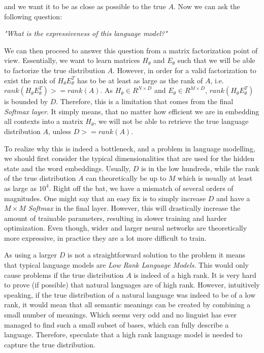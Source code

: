 and we want it to be as close as possible to the true $ A $. Now we can ask the following question:

\begin{center}
    \emph{"What is the expressiveness of this language model?"}
\end{center}

We can then proceed to answer this question from a matrix factorization point of view. Essentially, we want to learn matrices $ H_\theta $ and $ E_\theta $ such that we will be able to factorize the true distribution $ A $. However, in order for a valid factorization to exist the rank of $ H_\theta E^T_\theta $ has to be at least as large as the rank of $ A $, i.e. $ rank(H_\theta E^T_\theta ) >= rank(A) $. As $ H_\theta \in R^{N \times D} $ and $ E_\theta \in R^{M \times D} $, $ rank(H_\theta E^T_\theta ) $ is bounded by $ D $. Therefore, this is a limitation that comes from the final \emph{Softmax layer}. It simply means, that no matter how efficient we are in embedding all contexts into a matrix $ H_\theta $, we will not be able to retrieve the true language distribution $ A $, unless $ D >= rank(A) $.

To realize why this is indeed a bottleneck, and a problem in language modelling, we should first consider the typical dimensionalities that are used for the hidden state and the word embeddings. Usually, $ D $ is in the low hundreds, while the rank of the true distribution $ A $ can theoretically be up to $ M $ which is usually at least as large as $ 10^4 $. Right off the bat, we have a mismatch of several orders of magnitudes. One might say that an easy fix is to simply increase $ D $ and have a $ M \times M $ \emph{Softmax} in the final layer. However, this will drastically increase the amount of trainable parameters, resulting in slower training and harder optimization. Even though, wider and larger neural networks are theoretically more expressive, in practice they are a lot more difficult to train.

As using a larger $ D $ is not a straightforward solution to the problem it means that typical language models are \emph{Low Rank Language Models}. This would only cause problems if the true distribution $ A $ is indeed of a high rank. It is very hard to prove (if possible) that natural languages are of high rank. However, intuitively speaking, if the true distribution of a natural language was indeed to be of a low rank, it would mean that all semantic meanings can be created by combining a small number of meanings. Which seems very odd and no linguist has ever managed to find such a small subset of bases, which can fully describe a language. Therefore, \citet{yang2017breaking} speculate that a high rank language model is needed to capture the true distribution.

